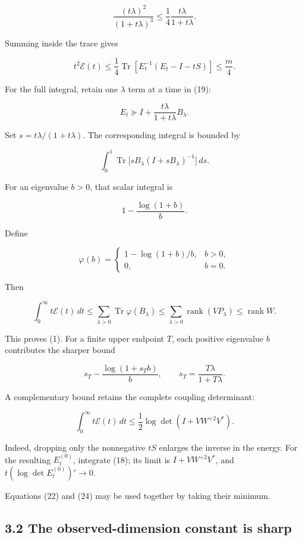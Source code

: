 \[
\frac{(t\lambda)^2}{(1+t\lambda)^3}
\le\frac14\frac{t\lambda}{1+t\lambda}.
\]

Summing inside the trace gives

\[
\boxed{
t^2\mathcal E(t)
\le
\frac14\operatorname{Tr}
\left[E_t^{-1}(E_t-I-tS)\right]
\le\frac m4.
}
\tag{21}
\]

For the full integral, retain one \(\lambda\) term at a time in (19):

\[
E_t\succeq I+\frac{t\lambda}{1+t\lambda}B_\lambda.
\]

Set \(s=t\lambda/(1+t\lambda)\). The corresponding integral is bounded by

\[
\int_0^1
\operatorname{Tr}\bigl[sB_\lambda(I+sB_\lambda)^{-1}\bigr]\,ds.
\]

For an eigenvalue \(b>0\), that scalar integral is

\[
1-\frac{\log(1+b)}b.
\]

Define

\[
\varphi(b)=
\begin{cases}
1-\log(1+b)/b,&b>0,\\
0,&b=0.
\end{cases}
\]

Then

\[
\boxed{
\int_0^\infty t\mathcal E(t)\,dt
\le
\sum_{\lambda>0}\operatorname{Tr}\varphi(B_\lambda)
\le
\sum_{\lambda>0}\operatorname{rank}(VP_\lambda)
\le\operatorname{rank}W.
}
\tag{22}
\]

This proves (1). For a finite upper endpoint \(T\), each positive eigenvalue \(b\) contributes the sharper bound

\[
s_T-\frac{\log(1+s_Tb)}b,
\qquad
s_T=\frac{T\lambda}{1+T\lambda}.
\tag{23}
\]

A complementary bound retains the complete coupling determinant:

\[
\boxed{
\int_0^\infty t\mathcal E(t)\,dt
\le
\frac12\log\det(I+VW^{+2}V^*).
}
\tag{24}
\]

Indeed, dropping only the nonnegative \(tS\) enlarges the inverse in the energy. For the resulting \(E_t^{(0)}\), integrate (18); its limit is \(I+VW^{+2}V^*\), and \(t(\log\det E_t^{(0)})'\to0\).

Equations (22) and (24) may be used together by taking their minimum.

\subsection{3.2 The observed-dimension constant is sharp}\label{the-observed-dimension-constant-is-sharp}

